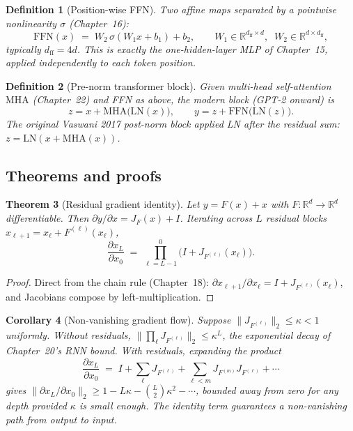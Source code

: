\documentclass[11pt]{article}
\newtheorem{theorem}{Theorem}[section]
\newtheorem{definition}[theorem]{Definition}
\newtheorem{corollary}[theorem]{Corollary}
\theoremstyle{remark}
\begin{document}
\begin{definition}[Position-wise FFN]
Two affine maps separated by a pointwise nonlinearity $\sigma$ (Chapter~16):
\[
  \mathrm{FFN}(x) \;=\; W_2 \,\sigma(W_1 x + b_1) + b_2,
  \qquad W_1 \in \mathbb{R}^{d_{\mathrm{ff}} \times d}, \;\; W_2 \in \mathbb{R}^{d \times d_{\mathrm{ff}}},
\]
typically $d_{\mathrm{ff}} = 4d$. This is exactly the one-hidden-layer MLP of Chapter~15, applied independently to each token position.
\end{definition}

\begin{definition}[Pre-norm transformer block]
Given multi-head self-attention $\mathrm{MHA}$ (Chapter~22) and FFN as above, the modern block (GPT-2 onward) is
\[
  z = x + \mathrm{MHA}\bigl(\mathrm{LN}(x)\bigr),
  \qquad
  y = z + \mathrm{FFN}\bigl(\mathrm{LN}(z)\bigr).
\]
The original Vaswani 2017 \emph{post-norm} block applied LN \emph{after} the residual sum: $z = \mathrm{LN}(x + \mathrm{MHA}(x))$.
\end{definition}

\subsection*{Theorems and proofs}

\begin{theorem}[Residual gradient identity]
\label{thm:res}
Let $y = F(x) + x$ with $F : \mathbb{R}^d \to \mathbb{R}^d$ differentiable. Then $\partial y / \partial x = J_F(x) + I$. Iterating across $L$ residual blocks $x_{\ell+1} = x_\ell + F^{(\ell)}(x_\ell)$,
\[
  \frac{\partial x_L}{\partial x_0} \;=\; \prod_{\ell = L-1}^{0} \bigl(I + J_{F^{(\ell)}}(x_\ell)\bigr).
\]
\end{theorem}

\begin{proof}
Direct from the chain rule (Chapter~18): $\partial x_{\ell+1}/\partial x_\ell = I + J_{F^{(\ell)}}(x_\ell)$, and Jacobians compose by left-multiplication.
\end{proof}

\begin{corollary}[Non-vanishing gradient flow]
Suppose $\|J_{F^{(\ell)}}\|_2 \le \kappa < 1$ uniformly. Without residuals, $\|\prod_\ell J_{F^{(\ell)}}\|_2 \le \kappa^L$, the exponential decay of Chapter~20's RNN bound. With residuals, expanding the product
\[
  \frac{\partial x_L}{\partial x_0} \;=\; I + \sum_\ell J_{F^{(\ell)}} + \sum_{\ell < m} J_{F^{(m)}} J_{F^{(\ell)}} + \cdots
\]
gives $\|\partial x_L/\partial x_0\|_2 \ge 1 - L\kappa - \binom{L}{2}\kappa^2 - \cdots$, bounded away from zero for any depth provided $\kappa$ is small enough. The identity term \emph{guarantees} a non-vanishing path from output to input.
\end{corollary}
\end{document}

